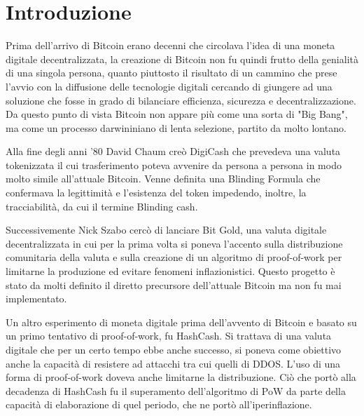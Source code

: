 
\cleardoublepage
{}

\chapter{Introduzione}
Prima dell'arrivo di Bitcoin erano decenni che circolava l'idea di una moneta digitale decentralizzata, la creazione di Bitcoin non fu quindi frutto della genialità di una singola persona, quanto piuttosto il risultato di un cammino che prese l'avvio con la diffusione delle tecnologie digitali cercando di giungere ad una soluzione che fosse in grado di bilanciare efficienza, sicurezza e decentralizzazione. Da questo punto di vista Bitcoin non appare più come una sorta di "Big Bang", ma come un processo darwininiano di lenta selezione, partito da molto lontano. 

Alla fine degli anni '80 David Chaum creò DigiCash che prevedeva una valuta tokenizzata il cui trasferimento poteva avvenire da persona a persona in modo molto simile all'attuale Bitcoin. Venne definita una Blinding Formula che confermava la legittimità e l'esistenza del token impedendo, inoltre, la tracciabilità, da cui il termine Blinding cash. 

Successivemente Nick Szabo cercò di lanciare Bit Gold, una valuta digitale decentralizzata in cui per la prima volta si poneva l'accento sulla distribuzione comunitaria della valuta e sulla creazione di un algoritmo di proof-of-work per limitarne la produzione ed evitare fenomeni inflazionistici. Questo progetto è stato da molti definito il diretto precursore dell'attuale Bitcoin ma non fu mai implementato.

Un altro esperimento di moneta digitale prima dell'avvento di Bitcoin e basato su un primo tentativo di proof-of-work, fu HashCash. Si trattava di una valuta digitale che per un certo tempo ebbe anche successo, si poneva come obiettivo anche la capacità di resistere ad attacchi tra cui quelli di DDOS. L'uso di una forma di proof-of-work doveva anche limitarne la distribuzione. Ciò che portò alla decadenza di HashCash fu il superamento dell'algoritmo di PoW da parte della capacità di elaborazione di quel periodo, che ne portò all'iperinflazione.

